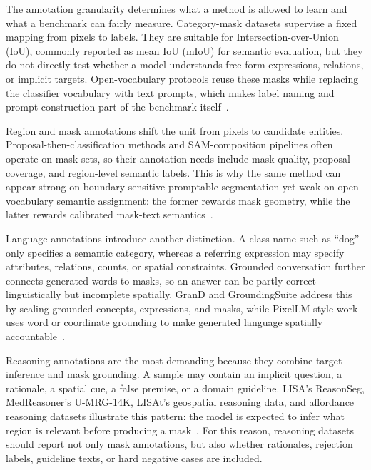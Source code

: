 The annotation granularity determines what a method is allowed to learn and what a benchmark can fairly measure. Category-mask datasets supervise a fixed mapping from pixels to labels. They are suitable for Intersection-over-Union (IoU), commonly reported as mean IoU (mIoU) for semantic evaluation, but they do not directly test whether a model understands free-form expressions, relations, or implicit targets. Open-vocabulary protocols reuse these masks while replacing the classifier vocabulary with text prompts, which makes label naming and prompt construction part of the benchmark itself~\citep{hhuangRenovatingNamesOpenvocabulary2024,ybenigmimFlossFreeLunch2025}.

Region and mask annotations shift the unit from pixels to candidate entities. Proposal-then-classification methods and SAM-composition pipelines often operate on mask sets, so their annotation needs include mask quality, proposal coverage, and region-level semantic labels. This is why the same method can appear strong on boundary-sensitive promptable segmentation yet weak on open-vocabulary semantic assignment: the former rewards mask geometry, while the latter rewards calibrated mask-text semantics~\citep{kirillov2023sam,xhanBoostingSegmentAnything2025,shiyHarnessingVisionFoundation2025}.

Language annotations introduce another distinction. A class name such as ``dog'' only specifies a semantic category, whereas a referring expression may specify attributes, relations, counts, or spatial constraints. Grounded conversation further connects generated words to masks, so an answer can be partly correct linguistically but incomplete spatially. GranD and GroundingSuite address this by scaling grounded concepts, expressions, and masks, while PixelLM-style work uses word or coordinate grounding to make generated language spatially accountable~\citep{rasheedGlammPixelGrounding2024,huGroundingSuiteMeasuringComplex2025,xuPixelalignedLanguageModel2024}.

Reasoning annotations are the most demanding because they combine target inference and mask grounding. A sample may contain an implicit question, a rationale, a spatial cue, a false premise, or a domain guideline. LISA's ReasonSeg, MedReasoner's U-MRG-14K, LISAt's geospatial reasoning data, and affordance reasoning datasets illustrate this pattern: the model is expected to infer what region is relevant before producing a mask~\citep{xlaiLisaReasoningSegmentation2024,yanMedreasonerReinforcementLearning2026,quenumLisatLanguageinstructedSegmentation2026,wangAffordancer1ReinforcementLearning2026}. For this reason, reasoning datasets should report not only mask annotations, but also whether rationales, rejection labels, guideline texts, or hard negative cases are included.

